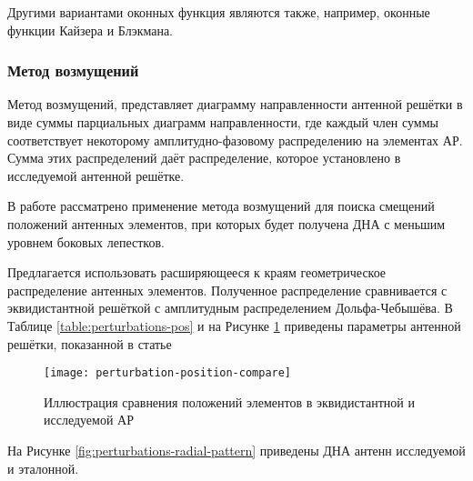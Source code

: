 Другими вариантами оконных функция являются также, например, оконные функции Кайзера и Блэкмана.


\subsubsection{Метод возмущений}\label{sec:perturbations-method}

Метод возмущений, представляет диаграмму направленности антенной решётки в виде суммы
парциальных диаграмм направленности, где каждый член суммы соответствует некоторому
амплитудно-фазовому распределению на элементах АР.
Сумма этих распределений даёт распределение, которое установлено в исследуемой антенной решётке.

В работе \cite{harrington1961sidelobe} рассматрено применение метода возмущений
для поиска смещений положений антенных элементов, при которых будет получена
ДНА с меньшим уровнем боковых лепестков.

Предлагается использовать расширяющееся к краям геометрическое распределение антенных элементов.
Полученное распределение сравнивается с эквидистантной решёткой с амплитудным распределением
Дольфа-Чебышёва. В Таблице \ref{table:perturbations-pos} и на Рисунке \ref{fig:perturbation-position-compare} приведены параметры антенной решётки, показанной в статье

\begin{table}[H]
    \caption{Относительные смещения элементов}\label{table:perturbations-pos}
\end{table}

\begin{figure}[H]
    \centering
    \texttt{[image: perturbation-position-compare]}
    \caption{Иллюстрация сравнения положений элементов в эквидистантной и исследуемой АР}%
    \label{fig:perturbation-position-compare}
\end{figure}

На Рисунке \ref{fig:perturbations-radial-pattern} приведены ДНА антенн исследуемой и эталонной.

